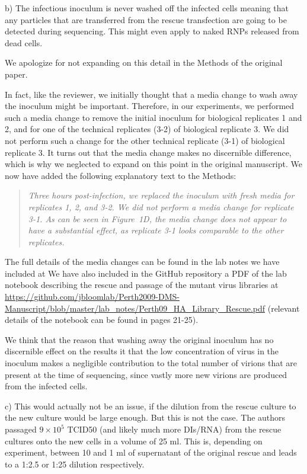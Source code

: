 \documentclass[11pt, oneside]{article}   	%
\newcommand{\response}[1]{{\color{black}#1}}
\begin{document}
b) The infectious inoculum is never washed off the infected cells meaning that any particles that are transferred from the rescue transfection are going to be detected during sequencing. This might even apply to naked RNPs released from dead cells. 

\response{
We apologize for not expanding on this detail in the Methods of the original paper.

In fact, like the reviewer, we initially thought that a media change to wash away the inoculum might be important. 
Therefore, in our experiments, we performed such a media change to remove the initial inoculum for biological replicates 1 and 2, and for one of the technical replicates (3-2) of biological replicate 3.
We did not perform such a change for the other technical replicate (3-1) of biological replicate 3.
It turns out that the media change makes no discernible difference, which is why we neglected to expand on this point in the original manuscript. 
We now have added the following explanatory text to the Methods:

\begin{quote}
\textsl{Three hours post-infection, we replaced the inoculum with fresh media for replicates 1, 2, and 3-2.
We did not perform a media change for replicate 3-1.
As can be seen in Figure~1D, the media change does not appear to have a substantial effect, as replicate 3-1 looks comparable to the other replicates.
}
\end{quote}
The full details of the media changes can be found in the lab notes we have included at We have also included in the GitHub repository a PDF of the lab notebook describing the rescue and passage of the mutant virus libraries at \url{https://github.com/jbloomlab/Perth2009-DMS-Manuscript/blob/master/lab_notes/Perth09_HA_Library_Rescue.pdf} (relevant details of the notebook can be found in pages 21-25).

We think that the reason that washing away the original inoculum has no discernible effect on the results it that the low concentration of virus in the inoculum makes a negligible contribution to the total number of virions that are present at the time of sequencing, since vastly more new virions are produced from the infected cells.
}

c) This would actually not be an issue, if the dilution from the rescue culture to the new culture would be large enough. But this is not the case. The authors passaged $9\times10^5$ TCID50 (and likely much more DIs/RNA) from the rescue cultures onto the new cells in a volume of 25 ml. This is, depending on experiment, between 10 and 1 ml of supernatant of the original rescue and leads to a 1:2.5 or 1:25 dilution respectively. 
\end{document}
